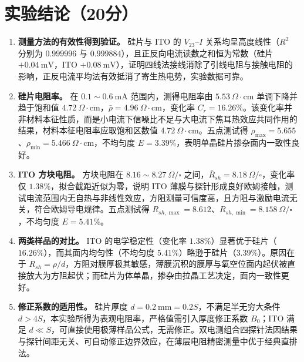 \documentclass[12pt,a4paper]{ctexart}
\begin{document}
\section*{实验结论（20分）}
\begin{enumerate}
    \item \textbf{测量方法的有效性得到验证。} 硅片与 ITO 的 $V_{23}$–$I$ 关系均呈高度线性（$R^2$ 分别为 $0.999996$ 与 $0.999884$），且正反向电流读数之和恒为常数（硅片 $+0.04\ \mathrm{mV}$，ITO $+0.08\ \mathrm{mV}$），证明四线法接线消除了引线电阻与接触电阻的影响，正反电流平均法有效抵消了寄生热电势，实验数据可靠。

    \item \textbf{硅片电阻率。} 在 $0.1\sim0.6\ \mathrm{mA}$ 范围内，测得电阻率由 $5.53\ \Omega\!\cdot\!\mathrm{cm}$ 单调下降并趋于饱和值 $4.72\ \Omega\!\cdot\!\mathrm{cm}$，$\bar\rho=4.96\ \Omega\!\cdot\!\mathrm{cm}$，变化率 $C_r=16.26\%$。该变化率并非材料本征性质，而是小电流下信噪比不足与大电流下焦耳热效应共同作用的结果，材料本征电阻率应取饱和区数值 $4.72\ \Omega\!\cdot\!\mathrm{cm}$。五点测试得 $\rho_{\max}=5.655$、$\rho_{\min}=5.466\ \Omega\!\cdot\!\mathrm{cm}$，不均匀度 $E=3.39\%$，表明单晶硅片掺杂面内一致性良好。

    \item \textbf{ITO 方块电阻。} 方块电阻在 $8.16\sim8.27\ \Omega/\square$ 之间，$\bar R_{sh}=8.18\ \Omega/\square$，变化率仅 $1.38\%$，拟合截距近似为零，说明 ITO 薄膜与探针形成良好欧姆接触，测试电流范围内无自热与非线性效应，方阻测量可信度高，且方阻与激励电流无关，符合欧姆导电规律。五点测试得 $R_{sh,\max}=8.612$、$R_{sh,\min}=8.158\ \Omega/\square$，不均匀度 $E=5.41\%$。

    \item \textbf{两类样品的对比。} ITO 的电学稳定性（变化率 $1.38\%$）显著优于硅片（$16.26\%$），而其面内均匀性（不均匀度 $5.41\%$）略逊于硅片（$3.39\%$）。原因在于 $R_{sh}=\rho/d$，方阻对膜厚极其敏感，薄膜沉积的膜厚与氧空位面内起伏被直接放大为方阻起伏；而硅片为体单晶，掺杂由拉晶工艺决定，面内一致性更好。

    \item \textbf{修正系数的适用性。} 硅片厚度 $d=0.2\ \mathrm{mm}=0.2S$，不满足半无穷大条件 $d>4S$，本实验所得为表观电阻率，严格值需引入厚度修正系数 $B_0$；ITO 满足 $d\ll S$，可直接使用极薄样品公式，无需修正。双电测组合四探针法因结果与探针间距无关、可自动修正边界效应，在薄层电阻精密测量中优于经典直排法。
\end{enumerate}
\end{document}
